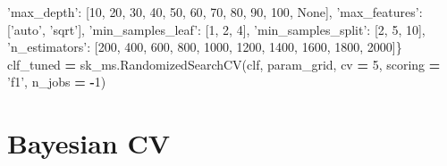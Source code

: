 \documentclass[]{book}
\newenvironment{Shaded}{\begin{snugshade}}{\end{snugshade}}
\newcommand{\DecValTok}[1]{\textcolor[rgb]{0.00,0.00,0.81}{#1}}
\newcommand{\StringTok}[1]{\textcolor[rgb]{0.31,0.60,0.02}{#1}}
\newcommand{\VariableTok}[1]{\textcolor[rgb]{0.00,0.00,0.00}{#1}}
\newcommand{\OperatorTok}[1]{\textcolor[rgb]{0.81,0.36,0.00}{\textbf{#1}}}
\newcommand{\NormalTok}[1]{#1}
\begin{document}
\begin{Shaded}
\begin{Highlighting}[]
 \StringTok{'max_depth'}\NormalTok{: [}\DecValTok{10}\NormalTok{, }\DecValTok{20}\NormalTok{, }\DecValTok{30}\NormalTok{, }\DecValTok{40}\NormalTok{, }\DecValTok{50}\NormalTok{, }\DecValTok{60}\NormalTok{, }\DecValTok{70}\NormalTok{, }\DecValTok{80}\NormalTok{, }\DecValTok{90}\NormalTok{, }\DecValTok{100}\NormalTok{, }\VariableTok{None}\NormalTok{],}
 \StringTok{'max_features'}\NormalTok{: [}\StringTok{'auto'}\NormalTok{, }\StringTok{'sqrt'}\NormalTok{],}
 \StringTok{'min_samples_leaf'}\NormalTok{: [}\DecValTok{1}\NormalTok{, }\DecValTok{2}\NormalTok{, }\DecValTok{4}\NormalTok{],}
 \StringTok{'min_samples_split'}\NormalTok{: [}\DecValTok{2}\NormalTok{, }\DecValTok{5}\NormalTok{, }\DecValTok{10}\NormalTok{],}
 \StringTok{'n_estimators'}\NormalTok{: [}\DecValTok{200}\NormalTok{, }\DecValTok{400}\NormalTok{, }\DecValTok{600}\NormalTok{, }\DecValTok{800}\NormalTok{, }\DecValTok{1000}\NormalTok{, }\DecValTok{1200}\NormalTok{, }\DecValTok{1400}\NormalTok{, }\DecValTok{1600}\NormalTok{, }\DecValTok{1800}\NormalTok{, }\DecValTok{2000}\NormalTok{]\}}
\NormalTok{clf_tuned }\OperatorTok{=}\NormalTok{ sk_ms.RandomizedSearchCV(clf, param_grid, cv }\OperatorTok{=} \DecValTok{5}\NormalTok{, scoring }\OperatorTok{=} \StringTok{'f1'}\NormalTok{, n_jobs }\OperatorTok{=} \OperatorTok{-}\DecValTok{1}\NormalTok{)}
\end{Highlighting}
\end{Shaded}

\section{Bayesian CV}\label{bayesian-cv}
\end{document}
